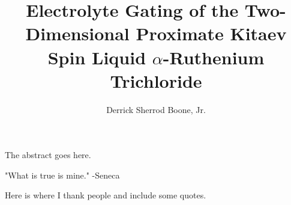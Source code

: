 \documentclass[12pt]{report}
\title{Electrolyte Gating of the Two-Dimensional Proximate
            Kitaev Spin Liquid $\alpha$-Ruthenium Trichloride}
\author{Derrick Sherrod Boone, Jr.}
\begin{document}

    \beforepreface


        The abstract goes here.

\newpage

"What is true is mine." -Seneca

        Here is where I thank people and include some quotes.

    \afterpreface
 
 











\end{document}
